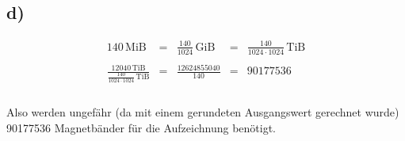 \documentclass[a4paper]{scrartcl}
\begin{document}
	\subsection{d)}
		\[
		\begin{array}{lclcl}
			140\,\text{MiB}&=& \frac{140}{1024}\,\text{GiB}&=& \frac{140}{1024\cdot 1024}
				\,\text{TiB}\\\\
			\frac{12040\,\text{TiB}}{\frac{140}{1024\cdot 1024}\,\text{TiB}} &=& \frac{12624855040}
				{140} &=& 90177536\\
		\end{array}
		\]\\
		Also werden ungefähr (da mit einem gerundeten Ausgangswert gerechnet wurde) 90177536 
		Magnetbänder für die Aufzeichnung benötigt.		
\end{document}

